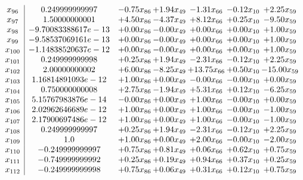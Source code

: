 \documentclass[8pt]{article}
\begin{document}
\[\begin{array}{c| c c@{\hskip 2pt} c@{\hskip 2pt} c@{\hskip 2pt} c@{\hskip 2pt} c@{\hskip 2pt} }
 x_{96}   &  0.249999999997 & -0.75 x_{86} & +  1.94 x_{49} & -1.31 x_{66} & -0.12 x_{10} & +  2.25 x_{59}\\
 x_{97}   &  1.50000000001 & +  4.50 x_{86} & -4.37 x_{49} & +  8.12 x_{66} & +  0.25 x_{10} & -9.50 x_{59}\\
 x_{98}   &  -9.70083388617e-13 & +  0.00 x_{86} & -0.00 x_{49} & +  0.00 x_{66} & +  0.00 x_{10} & +  1.00 x_{59}\\
 x_{99}   &  -9.58537069161e-13 & +  0.00 x_{86} & -0.00 x_{49} & +  0.00 x_{66} & +  0.00 x_{10} & +  1.00 x_{59}\\
 x_{100}   &  -1.14838520637e-12 & +  0.00 x_{86} & -0.00 x_{49} & +  0.00 x_{66} & +  0.00 x_{10} & +  1.00 x_{59}\\
 x_{101}   &  0.249999999998 & +  0.25 x_{86} & +  1.94 x_{49} & -2.31 x_{66} & -0.12 x_{10} & +  2.25 x_{59}\\
 x_{102}   &  2.00000000002 & +  6.00 x_{86} & -8.25 x_{49} & + 13.75 x_{66} & +  0.50 x_{10} & -15.00 x_{59}\\
 x_{103}   &  1.16814891093e-12 & +  1.00 x_{86} & +  0.00 x_{49} & -0.00 x_{66} & -0.00 x_{10} & +  0.00 x_{59}\\
 x_{104}   &  0.750000000008 & +  2.75 x_{86} & -1.94 x_{49} & +  5.31 x_{66} & +  0.12 x_{10} & -6.25 x_{59}\\
 x_{105}   &  5.15767983876e-14 & -0.00 x_{86} & +  0.00 x_{49} & +  1.00 x_{66} & -0.00 x_{10} & +  0.00 x_{59}\\
 x_{106}   &  2.02962646689e-12 & +  1.00 x_{86} & +  0.00 x_{49} & +  1.00 x_{66} & -0.00 x_{10} & -1.00 x_{59}\\
 x_{107}   &  2.17900697486e-12 & +  1.00 x_{86} & +  0.00 x_{49} & +  1.00 x_{66} & -0.00 x_{10} & -1.00 x_{59}\\
 x_{108}   &  0.249999999997 & +  0.25 x_{86} & +  1.94 x_{49} & -2.31 x_{66} & -0.12 x_{10} & +  2.25 x_{59}\\
 x_{109}   &  1.0 & +  1.00 x_{86} & +  0.00 x_{49} & +  2.00 x_{66} & -0.00 x_{10} & -2.00 x_{59}\\
 x_{110}   &  -0.249999999997 & +  0.75 x_{86} & +  0.81 x_{49} & +  0.06 x_{66} & +  0.62 x_{10} & +  0.75 x_{59}\\
 x_{111}   &  -0.749999999992 & +  0.25 x_{86} & +  0.19 x_{49} & +  0.94 x_{66} & +  0.37 x_{10} & +  0.25 x_{59}\\
 x_{112}   &  -0.249999999998 & +  0.75 x_{86} & +  0.06 x_{49} & +  0.31 x_{66} & +  0.12 x_{10} & +  0.75 x_{59}\\

\end{array}\]
\end{document}
